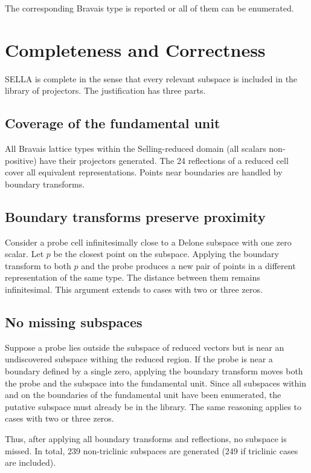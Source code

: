 \documentclass[preprint]{iucr}              %
\begin{document}
	The corresponding Bravais type is reported or all of them
	can be enumerated.
	
	\section{Completeness and Correctness}
	
	SELLA is complete in the sense that every relevant subspace is included in the
	library of projectors. The justification has three parts.
	
	\subsection{Coverage of the fundamental unit}
	
	All Bravais lattice types within the Selling-reduced domain (all scalars
	non-positive) have their projectors generated. The 24 reflections of a reduced cell
	cover all equivalent representations. Points near boundaries are handled by
	boundary transforms.
	
	\subsection{Boundary transforms preserve proximity}
	
	Consider a probe cell infinitesimally close to a Delone subspace with one zero scalar.
	Let $p$ be the closest point on the subspace. Applying the boundary transform
	to both $p$ and the probe produces a new pair of points in a different
	representation of the same type. The distance between them remains
	infinitesimal. This argument extends to cases with two or three zeros.
	
	\subsection{No missing subspaces}
	
	Suppose a probe lies outside the subspace of reduced vectors but is near an undiscovered
	subspace withing the reduced region. If the probe is near a boundary defined by a single zero, applying
	the boundary transform moves both the probe and the subspace into the
	fundamental unit. Since all subspaces within and on the boundaries of the
	fundamental unit have been enumerated, the putative subspace must already be in
	the library. The same reasoning applies to cases with two or three zeros.
	
	Thus, after applying all boundary transforms and reflections, no subspace is
	missed. In total, 239 non-triclinic subspaces are generated (249 if triclinic
	cases are included).
	
\end{document}

